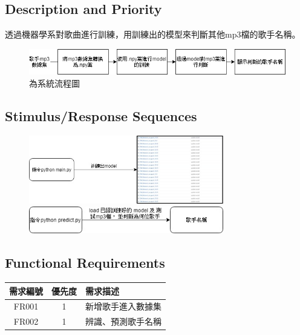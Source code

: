 \documentclass{article}
\begin{document}
\begin{CJK}{UTF8}{bkai}
\subsection{\Large Description and Priority }
	
	透過機器學系對歌曲進行訓練，用訓練出的模型來判斷其他mp3檔的歌手名稱。
\begin{figure}[h]
\begin{center}
\includegraphics[width=14cm]{FS.jpg}
\end{center}
\caption{為系統流程圖}
\label{fig:2}
\end{figure}

\subsection{\Large Stimulus/Response Sequences}
\begin{figure}[h]
\begin{center}
\includegraphics[width=8.5cm]{sti.jpg}
\newline
\newline
\newline
\includegraphics[width=8.5cm]{ss.jpg}
\end{center}
\label{fig:1}
\end{figure}

\subsection{ \Large Functional Requirements}
 \begin{center}
	\begin{tabular}{|c|c|p{8cm}|}\hline
		需求編號 & 優先度 & 需求描述 \\ \hline
		FR001 & 1 & 新增歌手進入數據集 \\ \hline
		FR002 & 1 &  辨識、預測歌手名稱\\\hline
	\end{tabular}
\end{center}


\end{CJK}
\end{document}
